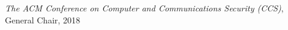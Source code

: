 \begin{innerenum}
    \item \textit{The ACM Conference on Computer and Communications Security (CCS)}, General Chair, 2018    
\end{innerenum}
    